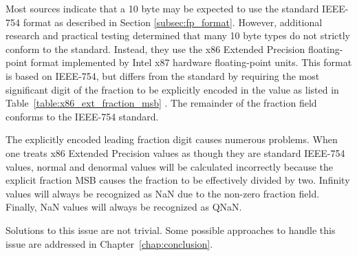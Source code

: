 Most sources indicate that a 10 byte  may be expected to use the standard IEEE-754 format as described in Section \ref{subsec:fp_format}. However, additional research and practical testing determined that many 10 byte types do not strictly conform to the standard. Instead, they use the x86 Extended Precision floating-point format implemented by Intel x87 hardware floating-point units. This format is based on IEEE-754, but differs from the standard by requiring the most significant digit of the fraction to be explicitly encoded in the value as listed in Table~\ref{table:x86_ext_fraction_msb} \cite{Intel:DevManual}. The remainder of the fraction field conforms to the IEEE-754 standard.

The explicitly encoded leading fraction digit causes numerous problems. When one treats x86 Extended Precision values as though they are standard IEEE-754 values, normal and denormal values will be calculated incorrectly because the explicit fraction MSB causes the fraction to be effectively divided by two. Infinity values will always be recognized as NaN due to the non-zero fraction field. Finally, NaN values will always be recognized as QNaN.

Solutions to this issue are not trivial. Some possible approaches to handle this issue are addressed in Chapter~\ref{chap:conclusion}.